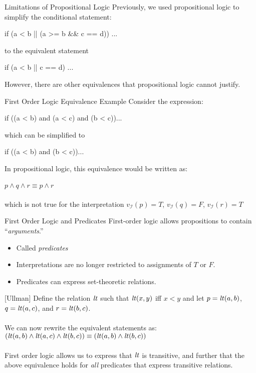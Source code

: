 \begin{wideslide}[bm=,toc=]{Limitations of Propositional Logic}
Previously, we used propositional logic to simplify the conditional statement:
\begin{program}
if (a < b || (a >= b \&\& c == d)) ...
\end{program}
\pause 
to the equivalent statement
\vspace{-1em}
\begin{program}
if (a < b || c == d) ...
\end{program}
\pause
However, there are other equivalences that propositional logic cannot justify.
\end{wideslide}

\begin{wideslide}[bm=,toc=]{First Order Logic Equivalence Example}
Consider the expression:
\begin{program}
if ((a < b) and (a < c) and (b < c))...
\end{program}
\pause
which can be simplified to
\vspace{-1em}
\begin{program}
if ((a < b) and (b < c))...
\end{program}
\vspace{-1em}
\pause
In propositional logic, this equivalence would be written as:\\~\\
$p \land q \land r \equiv p \land r$\\~\\
\pause
which is not true for the interpretation $v_{\mathcal{I}}(p) = T$,
   $v_{\mathcal{I}}(q) = F$, $v_{\mathcal{I}}(r) = T$
\end{wideslide}

\begin{wideslide}[bm=,toc=]{First Order Logic and Predicates}
First-order logic allows propositions to contain ``\emph{arguments}.''
\begin{itemize}
\item<2-> Called \emph{predicates}
\item<3->Interpretations are no longer restricted to assignments of $T$ or $F$.
\item<4->Predicates can express set-theoretic relations.
\end{itemize}
\pause[4]
\begin{ex}{}[Ullman]
Define the relation $\mbox{\it lt\/}$ such that $\mbox{\it lt\/}(x,y)$ iff $x < y$ and 
let $p = \mbox{\it lt\/}(a,b)$, $q = \mbox{\it lt\/}(a,c)$, and $r = \mbox{\it lt\/}(b,c)$.
\\~\\
\pause
We can now rewrite the equivalent statements as:\\
$(\mbox{\it lt\/}(a,b) \land \mbox{\it lt\/}(a,c) \land \mbox{\it lt\/}(b,c)) \equiv (\mbox{\it lt\/}(a,b) \land \mbox{\it lt\/}(b,c))$
\\~\\
\pause
First order logic allows us to express that $\mbox{\it lt\/}$ is transitive, and further that the above
equivalence holds for \emph{all} predicates that express transitive relations.
\end{ex}
\end{wideslide}

